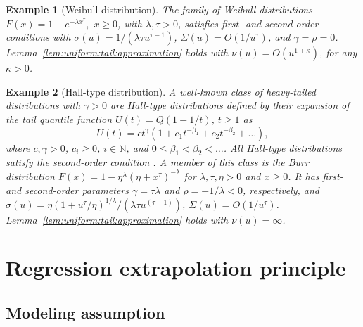 \documentclass{statsoc}
\newtheorem{example}{Example}
\theoremstyle{break}
\begin{document}
\begin{example}[Weibull distribution]\label{example:weibull}
	The family of Weibull distributions $F(x) = 1 - e^{-\lambda x^\tau},$ $x\geq 0$, with $\lambda, \tau > 0$, satisfies first- and second-order conditions with 
	$\sigma(u) = 1/(\lambda \tau u^{\tau - 1})$, $\Sigma(u) = O(1/u^\tau)$, and $\gamma= \rho =0$.
	Lemma~\ref{lem:uniform:tail:approximation} holds with $\nu(u) = O(u^{1+\kappa})$, for any $\kappa > 0$.
\end{example}





\begin{example}[Hall-type distribution]\label{ex:hall}
	A well-known class of heavy-tailed distributions with $\gamma > 0$ are
	Hall-type distributions defined by their expansion of the tail quantile function $U(t) = Q(1-1/t)$, $t\geq 1$ as 
	\begin{equation}
		U(t) = c t^{\gamma}\left( 1 + c_1t^{-\beta_1} + c_2 t^{-\beta_2} + \dots \right),
	\end{equation}
	where $c, \gamma >0$, $c_i \geq 0$, $i \in \mathbb N$, and $0 \leq \beta_1 < \beta_2 < \dots$. 
	All Hall-type distributions satisfy the second-order condition \citep[][Section 3.3.2]{beirlant:goegebeur:teugels:segers:dewaal:ferro:2004}.
	A member of this class is the Burr distribution $F(x) = 1 - \eta^\lambda (\eta + x^\tau)^{-\lambda}$ for $\lambda, \tau , \eta > 0$ and $x \geq 0$. It has first- and second-order parameters $\gamma = \tau \lambda$ and $\rho = -1/\lambda < 0$, respectively, and
	 $\sigma(u) = \eta \left( 1 + u^\tau/\eta\right)^{1/\lambda} /(\lambda \tau u^{(\tau -1)}) $, $\Sigma(u) = O(1/u^\tau)$. Lemma~\ref{lem:uniform:tail:approximation} holds with $\nu(u) = \infty$.
\end{example}



\section{Regression extrapolation principle}\label{sec:extrapolation_principle}

\subsection{Modeling assumption}\label{sec:model_assumption}
\end{document}
